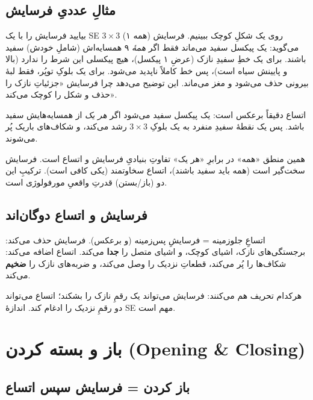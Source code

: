 \documentclass[12pt,a4paper]{article}
\begin{document}
\subsection{مثالِ عددیِ فرسایش}

بیایید فرسایش را با یک SEِ $3\times3$ (همه ۱) روی یک شکلِ کوچک ببینیم. فرسایش می‌گوید: یک پیکسل
سفید می‌ماند فقط اگر \emph{همهٔ} ۹ همسایه‌اش (شاملِ خودش) سفید باشند. برای یک خطِ سفیدِ نازک
(عرضِ ۱ پیکسل)، هیچ پیکسلی این شرط را ندارد (بالا و پایینش سیاه است)، پس خط کاملاً ناپدید می‌شود.
برای یک بلوکِ توپُر، فقط لبهٔ بیرونی حذف می‌شود و مغز می‌ماند. این توضیح می‌دهد چرا فرسایش
«جزئیاتِ نازک را حذف و شکل را کوچک می‌کند».

اتساع دقیقاً برعکس است: یک پیکسل سفید می‌شود اگر \emph{هر یک} از همسایه‌هایش سفید باشد. پس یک نقطهٔ
سفیدِ منفرد به یک بلوکِ $3\times3$ رشد می‌کند، و شکاف‌های باریک پُر می‌شوند.

\begin{nokte}
همین منطق «همه» در برابرِ «هر یک» تفاوتِ بنیادیِ فرسایش و اتساع است. فرسایش سخت‌گیر است (همه باید
سفید باشند)، اتساع سخاوتمند (یکی کافی است). ترکیبِ این دو (باز/بستن) قدرتِ واقعیِ مورفولوژی است.
\end{nokte}

\subsection{فرسایش و اتساع دوگان‌اند}

اتساعِ جلو‌زمینه = فرسایشِ پس‌زمینه (و برعکس). فرسایش حذف می‌کند: برجستگی‌های نازک، اشیای کوچک، و
اشیای متصل را \textbf{جدا} می‌کند. اتساع اضافه می‌کند: شکاف‌ها را پُر می‌کند، قطعاتِ نزدیک را
وصل می‌کند، و ضربه‌های نازک را \textbf{ضخیم} می‌کند.

\begin{hoshdar}
هرکدام تحریف هم می‌کنند: فرسایش می‌تواند یک رقمِ نازک را بشکند؛ اتساع می‌تواند دو رقمِ نزدیک را
ادغام کند. اندازهٔ SE مهم است.
\end{hoshdar}

\section{باز و بسته کردن (Opening \& Closing)}

\subsection{باز کردن = فرسایش سپس اتساع}
\end{document}

